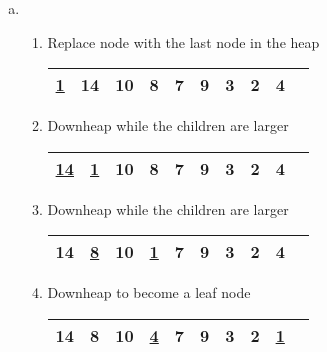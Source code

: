 \documentclass[fleqn, 12pt]{article}
\begin{document}
\begin{enumerate}[a)]
\item
    \begin{enumerate}[Step 1:]
    \item Replace node with the last node in the heap
        \begin{center}
            \begin{tabular}{|*{10}{c|}}
                \hline
                \underline{1} & 14 & 10 & 8 & 7 & 9 & 3 & 2 & 4\\
                \hline
            \end{tabular}
        \end{center}
        

    \item Downheap while the children are larger
        \begin{center}
            \begin{tabular}{|*{10}{c|}}
                \hline
                \underline{14} & \underline{1} & 10 & 8 & 7 & 9 & 3 & 2 & 4\\
                \hline
            \end{tabular}
        \end{center}
        
    \item Downheap while the children are larger
        \begin{center}
            \begin{tabular}{|*{10}{c|}}
                \hline
                14 & \underline{8} & 10 & \underline{1} & 7 & 9 & 3 & 2 & 4\\
                \hline
            \end{tabular}
        \end{center}
    
    \item Downheap to become a leaf node
        \begin{center}
            \begin{tabular}{|*{10}{c|}}
                \hline
                14 & 8 & 10 & \underline{4} & 7 & 9 & 3 & 2 & \underline{1}\\
                \hline
            \end{tabular}
        \end{center}
    \end{enumerate}


\end{enumerate}
\end{document}

